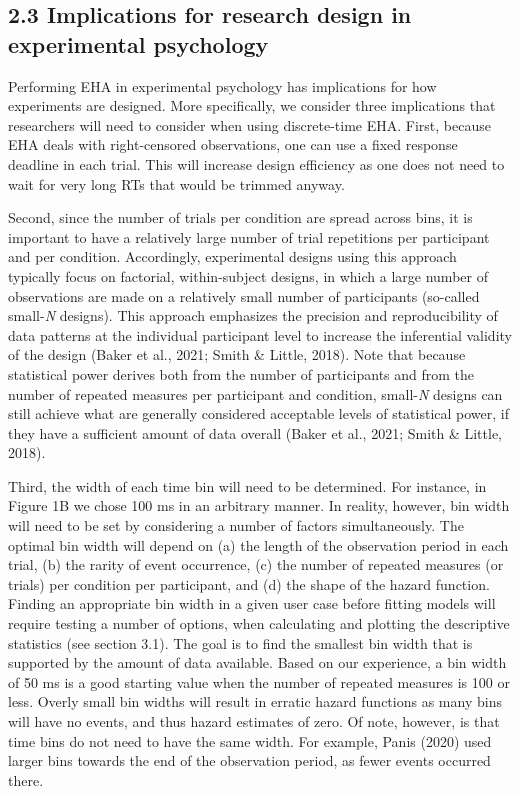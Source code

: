 \documentclass[
  man, donotrepeattitle,floatsintext]{apa6}
\begin{document}
\subsection{2.3 Implications for research design in experimental psychology}\label{implications-for-research-design-in-experimental-psychology}

Performing EHA in experimental psychology has implications for how experiments are designed.
More specifically, we consider three implications that researchers will need to consider when using discrete-time EHA. First, because EHA deals with right-censored observations, one can use a fixed response deadline in each trial. This will increase design efficiency as one does not need to wait for very long RTs that would be trimmed anyway.

Second, since the number of trials per condition are spread across bins, it is important to have a relatively large number of trial repetitions per participant and per condition. Accordingly, experimental designs using this approach typically focus on factorial, within-subject designs, in which a large number of observations are made on a relatively small number of participants (so-called small-\emph{N} designs). This approach emphasizes the precision and reproducibility of data patterns at the individual participant level to increase the inferential validity of the design (Baker et al., 2021; Smith \& Little, 2018). Note that because statistical power derives both from the number of participants and from the number of repeated measures per participant and condition, small-\emph{N} designs can still achieve what are generally considered acceptable levels of statistical power, if they have a sufficient amount of data overall (Baker et al., 2021; Smith \& Little, 2018).

Third, the width of each time bin will need to be determined.
For instance, in Figure 1B we chose 100 ms in an arbitrary manner.
In reality, however, bin width will need to be set by considering a number of factors simultaneously.
The optimal bin width will depend on (a) the length of the observation period in each trial, (b) the rarity of event occurrence, (c) the number of repeated measures (or trials) per condition per participant, and (d) the shape of the hazard function.
Finding an appropriate bin width in a given user case before fitting models will require testing a number of options, when calculating and plotting the descriptive statistics (see section 3.1). The goal is to find the smallest bin width that is supported by the amount of data available. Based on our experience, a bin width of 50 ms is a good starting value when the number of repeated measures is 100 or less. Overly small bin widths will result in erratic hazard functions as many bins will have no events, and thus hazard estimates of zero. Of note, however, is that time bins do not need to have the same width. For example, Panis (2020) used larger bins towards the end of the observation period, as fewer events occurred there.
\end{document}
